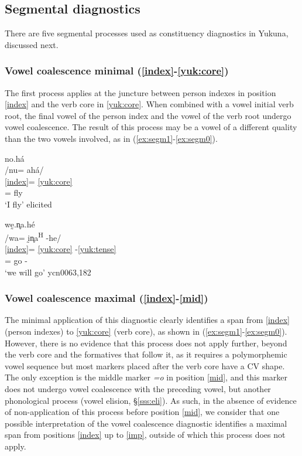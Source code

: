 \documentclass[output=paper]{langscibook}
\begin{document}
\subsection{Segmental diagnostics}
\label{ss:segm}

There are five segmental processes used as constituency diagnostics in Yukuna, discussed next.

\subsubsection{Vowel coalescence minimal (\ref{index}-\ref{yuk:core})}

The first process applies at the juncture between person indexes in position \ref{index} and the verb core in \ref{yuk:core}. When combined with a vowel initial verb root, the final vowel of the person index and the vowel of the verb root undergo vowel coalescence. The result of this process may be a vowel of a different quality than the two vowels involved, as in (\ref{ex:segm1}-\ref{ex:segm0}).

\ea \label{ex:segm1}
no.há  \\
    \glll /nu= ahá/  \\
          \ref{index}= \ref{yuk:core} \\
        \Fsg{}= fly\\
    \glt `I fly' \hfill elicited
 \z
 
 \ea \label{ex:segm0}
wḛ.n̥a.hé  \\
    \glll /wa= ḭn̥a\textsuperscript{H} -he/ \\
          \ref{index}= \ref{yuk:core} -\ref{yuk:tense}\\
        \Fpl{}= go -\Fut{}\\
    \glt `we will go' \hfill ycn0063,182
 \z

\subsubsection{Vowel coalescence maximal  (\ref{index}-\ref{mid})}

The minimal application of this diagnostic clearly identifies a span from \ref{index} (person indexes) to \ref{yuk:core} (verb core), as shown in (\ref{ex:segm1}-\ref{ex:segm0}). However, there is no evidence that this process does not apply further, beyond the verb core and the formatives that follow it, as it requires a polymorphemic vowel sequence but most markers placed after the verb core have a CV shape. The only exception is the middle marker \textit{=o} in position \ref{mid}, and this marker does not undergo vowel coalescence with the preceding vowel, but another phonological process (vowel elision, §\ref{sss:eli}). As such, in the absence of evidence of non-application of this process before position \ref{mid}, we consider that one possible interpretation of the vowel coalescence diagnostic identifies a maximal span from positions \ref{index} up to \ref{imp}, outside of which this process does not apply.
\end{document}
